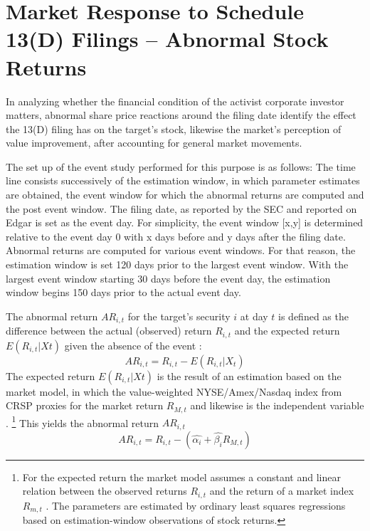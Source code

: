 \documentclass[12pt]{article}
\begin{document}
\section{Market Response to Schedule 13(D) Filings -- Abnormal Stock Returns}
\noindent In analyzing whether the financial condition of the activist corporate investor matters, abnormal share price reactions around the filing date identify the effect the 13(D) filing has on the target's stock, likewise the market's perception of value improvement, after accounting for general market movements.\par
The set up of the event study performed for this purpose is as follows: The time line consists successively of the estimation window, in which parameter estimates are obtained, the event window for which the abnormal returns are computed and the post event window. 
The filing date, as reported by the SEC and reported on Edgar is set as the event day. For simplicity, the event window [x,y] is determined relative to the event day 0 with x days before and y days after the filing date. Abnormal returns are computed for various event windows. For that reason, the estimation window is set 120 days prior to the largest event window. With the largest event window starting 30 days before the event day, the estimation window begins 150 days prior to the actual event day.\par
The abnormal return $AR_{i,t}$ for the target's security $i$ at day $t$ is defined as the difference between the actual (observed) return $R_{i,t}$ and the expected return $E(R_{i,t}|X{t})$ given the absence of the event \citep[p.15]{MacKinlay1997}:
	\begin{equation}\label{eq:1}
		AR_{i,t}=R_{i,t}-E(R_{i,t}|X_{t})
	\end{equation}
The expected return $E(R_{i,t}|X{t})$ is the result of an estimation based on the market model, in which the value-weighted NYSE/Amex/Nasdaq index from CRSP proxies for the market return $R_{M,t}$ and likewise is the independent variable \citep[p.18]{MacKinlay1997}.
	\footnote{For the expected return the market model assumes a constant and linear relation between the observed returns $R_{i,t}$ and the return of a market index $R_{m,t}$ \citep[p.18]{MacKinlay1997}. The parameters are estimated by ordinary least squares regressions based on estimation-window observations of stock returns.}
This yields the abnormal return $AR_{i,t}$
	\begin{equation}\label{eq:2}
		AR_{i,t}=R_{i,t}-(\hat{\alpha_{i}}+\hat{\beta_{i}}R_{M,t})
	\end{equation}
\end{document}
